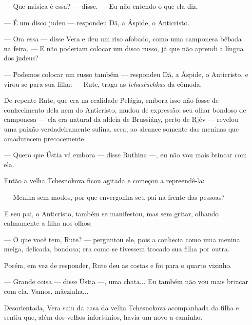 --- Que música é essa? --- disse. --- Eu não entendo o que ela diz.

--- É um disco judeu --- respondeu Dã, a Áspide, o Anticristo.

--- Ora essa --- disse Vera e deu um riso afobado, como uma camponesa
bêbada na feira. --- E não poderiam colocar um disco russo, já que não
aprendi a língua dos judeus?

--- Podemos colocar um russo também --- respondeu Dã, a Áspide, o
Anticristo, e virou-se para sua filha: --- Rute, traga as
\emph{tchastuchkas} da cômoda.

De repente Rute, que era na realidade Pelágia, embora isso não fosse de
conhecimento dela nem do Anticristo, mudou de expressão: seu olhar
bondoso de camponesa --- ela era natural da aldeia de Brussiány, perto
de Rjév --- revelou uma paixão verdadeiramente sulina, seca, ao alcance
somente das meninas que amadurecem precocemente.

--- Quero que Ústia vá embora --- disse Ruthina ---, eu não vou mais
brincar com ela.

Então a velha Tchesnokova ficou agitada e começou a repreendê-la:

--- Menina sem-modos, por que envergonha seu pai na frente das pessoas?

E seu pai, o Anticristo, também se manifestou, mas sem gritar, olhando
calmamente a filha nos olhos:

--- O que você tem, Rute? --- perguntou ele, pois a conhecia como uma
menina meiga, delicada, bondosa; era como se tivessem trocado sua filha
por outra.

Porém, em vez de responder, Rute deu as costas e foi para o quarto
vizinho.

--- Grande coisa --- disse Ústia ---, uma chata... Eu também não vou
mais brincar com ela. Vamos, mãezinha...

Desorientada, Vera saiu da casa da velha Tchesnokova acompanhada da
filha e sentiu que, além dos velhos infortúnios, havia um novo a
caminho.

